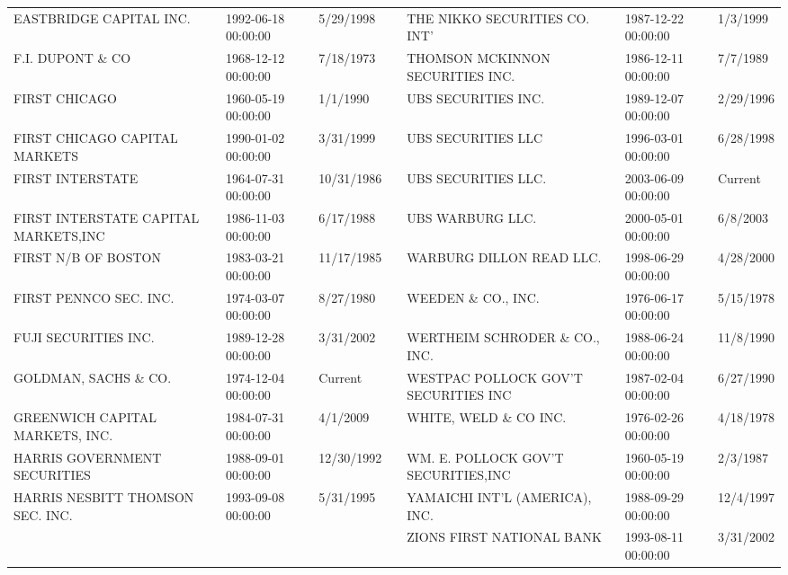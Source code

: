 \begin{tabular}{lllllll}
EASTBRIDGE CAPITAL INC.              & 1992-06-18 00:00:00 & 5/29/1998 &  & THE NIKKO SECURITIES CO. INT'       & 1987-12-22 00:00:00 & 1/3/1999 \\
F.I. DUPONT \& CO                     & 1968-12-12 00:00:00 & 7/18/1973 &  & THOMSON MCKINNON SECURITIES INC.    & 1986-12-11 00:00:00 & 7/7/1989 \\
FIRST CHICAGO                       & 1960-05-19 00:00:00 & 1/1/1990 &  & UBS SECURITIES INC.                 & 1989-12-07 00:00:00 & 2/29/1996 \\
FIRST CHICAGO CAPITAL MARKETS       & 1990-01-02 00:00:00 & 3/31/1999 &  & UBS SECURITIES LLC                  & 1996-03-01 00:00:00 & 6/28/1998 \\
FIRST INTERSTATE                     & 1964-07-31 00:00:00 & 10/31/1986 &  & UBS SECURITIES LLC.                 & 2003-06-09 00:00:00 & Current \\
FIRST INTERSTATE CAPITAL MARKETS,INC & 1986-11-03 00:00:00 & 6/17/1988 &  & UBS WARBURG LLC.                    & 2000-05-01 00:00:00 & 6/8/2003 \\
FIRST N/B OF BOSTON                  & 1983-03-21 00:00:00 & 11/17/1985 &  & WARBURG DILLON READ LLC.            & 1998-06-29 00:00:00 & 4/28/2000 \\
FIRST PENNCO SEC. INC.               & 1974-03-07 00:00:00 & 8/27/1980 &  & WEEDEN \& CO., INC.                   & 1976-06-17 00:00:00 & 5/15/1978 \\
FUJI SECURITIES INC.                & 1989-12-28 00:00:00 & 3/31/2002 &  & WERTHEIM SCHRODER \& CO., INC.        & 1988-06-24 00:00:00 & 11/8/1990 \\
GOLDMAN, SACHS \& CO.                & 1974-12-04 00:00:00 & Current &  & WESTPAC POLLOCK GOV'T SECURITIES INC & 1987-02-04 00:00:00 & 6/27/1990 \\
GREENWICH CAPITAL MARKETS, INC.      & 1984-07-31 00:00:00 & 4/1/2009 &  & WHITE, WELD \& CO INC.                & 1976-02-26 00:00:00 & 4/18/1978 \\
HARRIS GOVERNMENT SECURITIES        & 1988-09-01 00:00:00 & 12/30/1992 &  & WM. E. POLLOCK GOV'T SECURITIES,INC  & 1960-05-19 00:00:00 & 2/3/1987 \\
HARRIS NESBITT THOMSON SEC. INC.    & 1993-09-08 00:00:00 & 5/31/1995 &  & YAMAICHI INT'L (AMERICA), INC.      & 1988-09-29 00:00:00 & 12/4/1997 \\
 &  &  &  & ZIONS FIRST NATIONAL BANK            & 1993-08-11 00:00:00 & 3/31/2002 \\
\bottomrule
\end{tabular}
